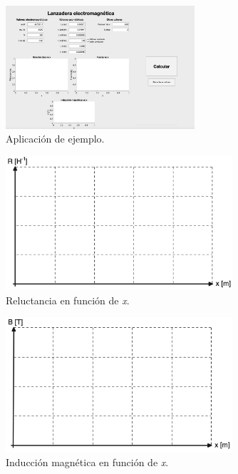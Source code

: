 \begin{figure}[H]
    \centering 
    \includegraphics[width=7cm]{FigurasMemoria/calculadoraSinPista.png}
    \caption{Aplicación de ejemplo.}
    \label{fig:calculadoraSinPista} %
\end{figure}

\newpage

\begin{figure}[H]
    \centering 
    \includegraphics[width=0.75\textwidth]{FigurasMemoria/grafReluctPractica.png}
    \caption{Reluctancia en función de \textit{x}.}
    \label{fig:grafReluctPractica} %
\end{figure}

\begin{figure}[H]
    \centering 
    \includegraphics[width=0.75\textwidth]{FigurasMemoria/grafInducPractica.png}
    \caption{Inducción magnética en función de \textit{x}.}
    \label{fig:grafInducPractica} %
\end{figure}


